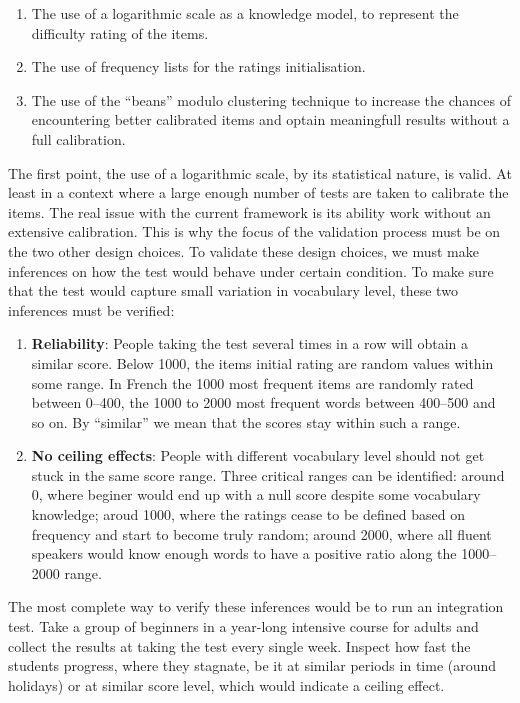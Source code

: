 \begin{enumerate}
  \item The use of a logarithmic scale as a knowledge model, to represent the difficulty rating of the items.
  \item The use of frequency lists for the ratings initialisation.
  \item The use of the ``beans'' modulo clustering technique to increase the chances of encountering better calibrated items and optain meaningfull results without a full calibration.
\end{enumerate}

The first point, the use of a logarithmic scale, by its statistical nature, is valid. At least in a context where a large enough number of tests are taken to calibrate the items. The real issue with the current framework is its ability work without an extensive calibration. This is why the focus of the validation process must be on the two other design choices. To validate these design choices, we must make inferences on how the test would behave under certain condition. To make sure that the test would capture small variation in vocabulary level, these two inferences must be verified:

\begin{enumerate}
  \item \textbf{Reliability}: People taking the test several times in a row will obtain a similar score. Below 1000, the items initial rating are random values within some range. In French the 1000 most frequent items are randomly rated between 0–400, the 1000 to 2000 most frequent words between 400–500 and so on. By ``similar'' we mean that the scores stay within such a range.
  \item \textbf{No ceiling effects}: People with different vocabulary level should not get stuck in the same score range. Three critical ranges can be identified: around 0, where beginer would end up with a null score despite some vocabulary knowledge; aroud 1000, where the ratings cease to be defined based on frequency and start to become truly random; around 2000, where all fluent speakers would know enough words to have a positive ratio along the 1000–2000 range.
\end{enumerate}

The most complete way to verify these inferences would be to run an integration test. Take a group of beginners in a year-long intensive course for adults and collect the results at taking the test every single week. Inspect how fast the students progress, where they stagnate, be it at similar periods in time (around holidays) or at similar score level, which would indicate a ceiling effect.

